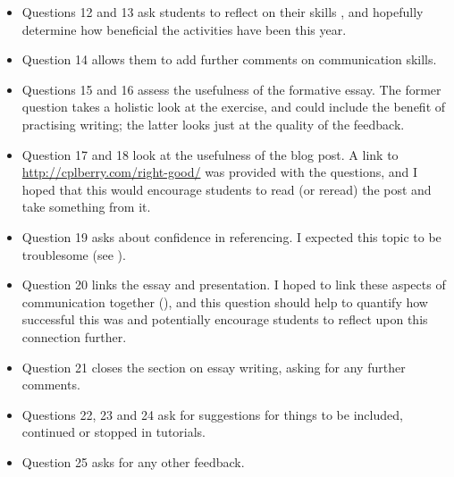 \begin{itemize}
\item Questions 12 and 13 ask students to reflect on their skills \citep[cf.][figure 4.15, section C]{Brown1988}, and hopefully determine how beneficial the activities have been this year.
\item Question 14 allows them to add further comments on communication skills.
\item Questions 15 and 16 assess the usefulness of the formative essay. The former question takes a holistic look at the exercise, and could include the benefit of practising writing; the latter looks just at the quality of the feedback.
\item Question 17 and 18 look at the usefulness of the blog post. A link to \url{http://cplberry.com/right-good/} was provided with the questions, and I hoped that this would encourage students to read (or reread) the post and take something from it.
\item Question 19 asks about confidence in referencing. I expected this topic to be troublesome (see ).
\item Question 20 links the essay and presentation. I hoped to link these aspects of communication together (), and this question should help to quantify how successful this was and potentially encourage students to reflect upon this connection further.
\item Question 21 closes the section on essay writing, asking for any further comments.
\item Questions 22, 23 and 24 ask for suggestions for things to be included, continued or stopped in tutorials.
\item Question 25 asks for any other feedback.
\end{itemize}
